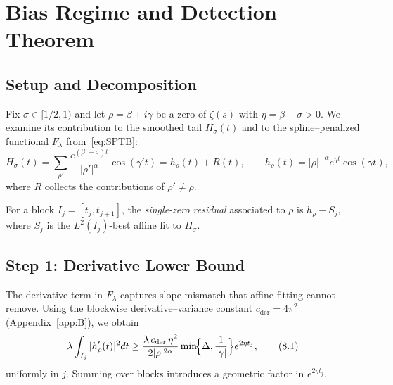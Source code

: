 
\section{Bias Regime and Detection Theorem}\label{sec:bias}

\subsection{Setup and Decomposition}

Fix $\sigma\in[1/2,1)$ and let $\rho=\beta+i\gamma$ be a zero of $\zeta(s)$ with
$\eta=\beta-\sigma>0$.  We examine its contribution to the smoothed tail
$H_\sigma(t)$ and to the spline–penalized functional $F_\lambda$
from~\eqref{eq:SPTB}:
\begin{equation*}
H_\sigma(t)
  = \sum_{\rho'} \frac{e^{(\beta'-\sigma)t}}{|\rho'|^{\alpha}}\cos(\gamma' t)
  = h_\rho(t)+R(t),
\qquad
h_\rho(t)=|\rho|^{-\alpha}e^{\eta t}\cos(\gamma t),
\end{equation*}
where $R$ collects the contributions of $\rho'\ne\rho$.

\begin{definition}\label{def:single-zero}
For a block $I_j=[t_j,t_{j+1}]$, the \emph{single-zero residual}
associated to $\rho$ is $h_\rho-S_j$, where $S_j$ is the $L^2(I_j)$-best affine fit to $H_\sigma$.
\end{definition}

\subsection{Step 1: Derivative Lower Bound}\label{step:derivative-lb}

The derivative term in $F_\lambda$ captures slope mismatch that affine fitting cannot remove.
Using the blockwise derivative–variance constant $c_{\mathrm{der}}=4\pi^2$
(Appendix~\ref{app:B}), we obtain
\begin{equation}
\lambda \int_{I_j} |h_\rho'(t)|^2 dt
  \ge \frac{\lambda\,c_{\mathrm{der}}\,\eta^2}{2|\rho|^{2\alpha}}
      \min\!\Bigl\{\Delta,\frac{1}{|\gamma|}\Bigr\}
      e^{2\eta t_j},
\tag{8.1}\label{eq:derivative-lb}
\end{equation}
uniformly in $j$.  Summing over blocks introduces a geometric factor in $e^{2\eta t_j}$.

